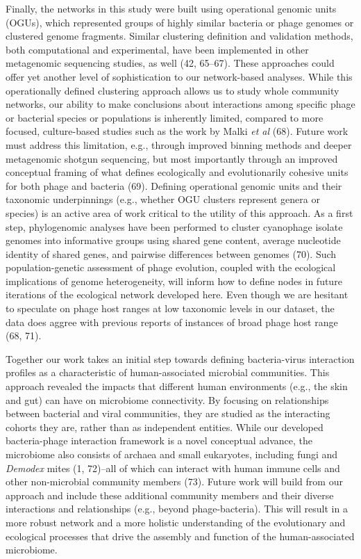 \documentclass[12pt,]{article}
\begin{document}
Finally, the networks in this study were built using operational genomic
units (OGUs), which represented groups of highly similar bacteria or
phage genomes or clustered genome fragments. Similar clustering
definition and validation methods, both computational and experimental,
have been implemented in other metagenomic sequencing studies, as well
(42, 65--67). These approaches could offer yet another level of
sophistication to our network-based analyses. While this operationally
defined clustering approach allows us to study whole community networks,
our ability to make conclusions about interactions among specific phage
or bacterial species or populations is inherently limited, compared to
more focused, culture-based studies such as the work by Malki \emph{et
al} (68). Future work must address this limitation, e.g., through
improved binning methods and deeper metagenomic shotgun sequencing, but
most importantly through an improved conceptual framing of what defines
ecologically and evolutionarily cohesive units for both phage and
bacteria (69). Defining operational genomic units and their taxonomic
underpinnings (e.g., whether OGU clusters represent genera or species)
is an active area of work critical to the utility of this approach. As a
first step, phylogenomic analyses have been performed to cluster
cyanophage isolate genomes into informative groups using shared gene
content, average nucleotide identity of shared genes, and pairwise
differences between genomes (70). Such population-genetic assessment of
phage evolution, coupled with the ecological implications of genome
heterogeneity, will inform how to define nodes in future iterations of
the ecological network developed here. Even though we are hesitant to
speculate on phage host ranges at low taxonomic levels in our dataset,
the data does aggree with previous reports of instances of broad phage
host range (68, 71).

Together our work takes an initial step towards defining bacteria-virus
interaction profiles as a characteristic of human-associated microbial
communities. This approach revealed the impacts that different human
environments (e.g., the skin and gut) can have on microbiome
connectivity. By focusing on relationships between bacterial and viral
communities, they are studied as the interacting cohorts they are,
rather than as independent entities. While our developed bacteria-phage
interaction framework is a novel conceptual advance, the microbiome also
consists of archaea and small eukaryotes, including fungi and
\emph{Demodex} mites (1, 72)--all of which can interact with human
immune cells and other non-microbial community members (73). Future work
will build from our approach and include these additional community
members and their diverse interactions and relationships (e.g., beyond
phage-bacteria). This will result in a more robust network and a more
holistic understanding of the evolutionary and ecological processes that
drive the assembly and function of the human-associated microbiome.
\end{document}
